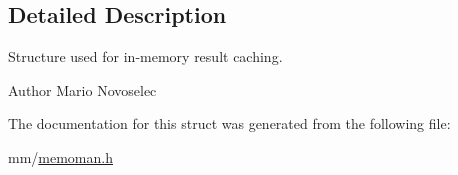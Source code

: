 \subsection{Detailed Description}
Structure used for in-\/memory result caching. 

\begin{DoxyAuthor}{Author}
Mario Novoselec 
\end{DoxyAuthor}


The documentation for this struct was generated from the following file\+:\begin{DoxyCompactItemize}
\item 
mm/\hyperlink{memoman_8h}{memoman.\+h}\end{DoxyCompactItemize}
